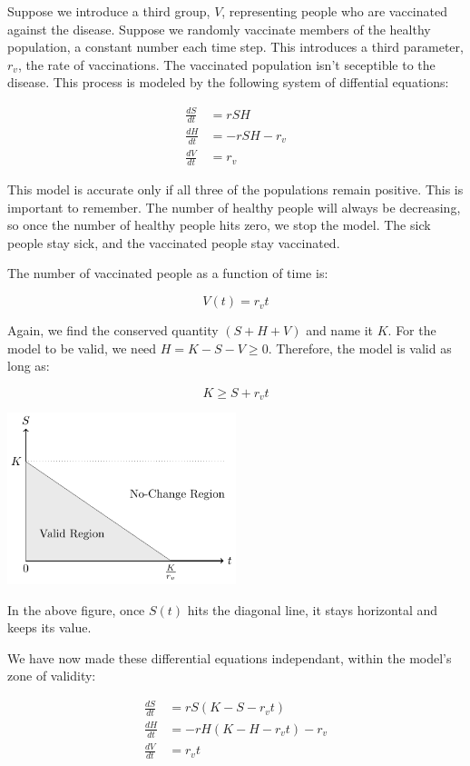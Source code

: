 \documentclass{article}
\begin{document}
Suppose we introduce a third group, $V$, representing people who are vaccinated	
	against the disease.
Suppose we randomly vaccinate members of the healthy population,
	a constant number each time step.
This introduces a third parameter, $r_v$, the rate of vaccinations.
The vaccinated population isn't seceptible to the disease.
This process is modeled by the following system of diffential equations:

\begin{align*}
\frac{dS}{dt} & = r S H \\
\frac{dH}{dt} & = - r S H - r_v \\
\frac{dV}{dt} & = r_v
\end{align*}

This model is accurate only if all three of the populations remain
	positive.
This is important to remember.
The number of healthy people will always be decreasing, so once
	the number of healthy people hits zero, we stop the model.
The sick people stay sick, and the vaccinated people stay vaccinated.

The number of vaccinated people as a function of time is:

\[ V(t) = r_v t \]

Again, we find the conserved quantity $\left( S + H + V \right)$ and
	name it $K$.
For the model to be valid, we need $H = K - S - V \geq 0$.
Therefore, the model is valid as long as:

\[ K \geq S + r_v t \]

\includegraphics[width=0.5\textwidth]{figures/admissible-region.pdf}

In the above figure, once $S(t)$ hits the diagonal line,
	it stays horizontal and keeps its value.

We have now made these differential equations independant,
	within the model's zone of validity:

\begin{align*}
\frac{dS}{dt} & = r S \left( K - S - r_v t \right)\\
\frac{dH}{dt} & = - r H \left( K - H - r_v t \right) - r_v \\
\frac{dV}{dt} & = r_v t
\end{align*}
\end{document}
